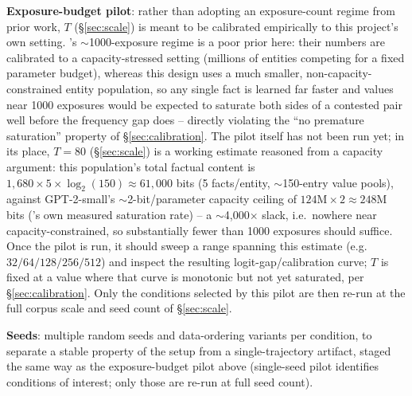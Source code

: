 \documentclass[11pt]{article}
\begin{document}
\textbf{Exposure-budget pilot}: rather than adopting an exposure-count regime
from prior work, $T$ (\S\ref{sec:scale}) is meant to be calibrated
empirically to this project's own setting. \citet{allenzhu2024capacity}'s
$\sim$1000-exposure regime is a poor prior here: their numbers are
calibrated to a capacity-stressed setting (millions of entities competing
for a fixed parameter budget), whereas this design uses a much smaller,
non-capacity-constrained entity population, so any single fact is learned
far faster and values near 1000 exposures would be expected to saturate both
sides of a contested pair well before the frequency gap does -- directly
violating the ``no premature saturation'' property of \S\ref{sec:calibration}.
The pilot itself has not been run yet; in its place, $T=80$
(\S\ref{sec:scale}) is a working estimate reasoned from a capacity argument:
this population's total factual content is
$1{,}680 \times 5 \times \log_2(150) \approx 61{,}000$ bits (5 facts/entity,
$\sim$150-entry value pools), against GPT-2-small's $\sim$2-bit/parameter
capacity ceiling of $124\text{M} \times 2 \approx 248$M bits
(\citet{allenzhu2024capacity}'s own measured saturation rate) -- a
$\sim$4{,}000$\times$ slack, i.e.\ nowhere near capacity-constrained, so
substantially fewer than 1000 exposures should suffice. Once the pilot is
run, it should sweep a range spanning this estimate (e.g.\
$32/64/128/256/512$) and inspect the resulting logit-gap/calibration curve;
$T$ is fixed at a value where that curve is monotonic but not yet saturated,
per \S\ref{sec:calibration}. Only the conditions selected by this pilot are
then re-run at the full corpus scale and seed count of \S\ref{sec:scale}.

\textbf{Seeds}: multiple random seeds and data-ordering variants per
condition, to separate a stable property of the setup from a
single-trajectory artifact, staged the same way as the exposure-budget pilot
above (single-seed pilot identifies conditions of interest; only those are
re-run at full seed count).
\end{document}

